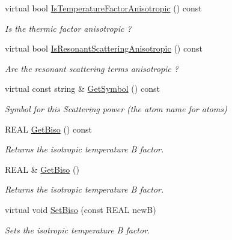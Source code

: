 \begin{DoxyCompactItemize}
virtual bool \mbox{\hyperlink{class_obj_cryst_1_1_scattering_power_aee21e7bd77b1098948b7612ada357317}{Is\+Temperature\+Factor\+Anisotropic}} () const
\begin{DoxyCompactList}\small\item\em Is the thermic factor anisotropic ? \end{DoxyCompactList}\item 
\mbox{\label{class_obj_cryst_1_1_scattering_power_ac4ed188348198aadc70f3c9b5faba4e6}} 
virtual bool \mbox{\hyperlink{class_obj_cryst_1_1_scattering_power_ac4ed188348198aadc70f3c9b5faba4e6}{Is\+Resonant\+Scattering\+Anisotropic}} () const
\begin{DoxyCompactList}\small\item\em Are the resonant scattering terms anisotropic ? \end{DoxyCompactList}\item 
virtual const string \& \mbox{\hyperlink{class_obj_cryst_1_1_scattering_power_afc2a98469a75c58259d4f81cd30510b9}{Get\+Symbol}} () const
\begin{DoxyCompactList}\small\item\em Symbol for this Scattering power (the atom name for atoms) \end{DoxyCompactList}\item 
R\+E\+AL \mbox{\hyperlink{class_obj_cryst_1_1_scattering_power_a410cbc9c760375aff093a901fd8ad0dd}{Get\+Biso}} () const
\begin{DoxyCompactList}\small\item\em Returns the isotropic temperature B factor. \end{DoxyCompactList}\item 
R\+E\+AL \& \mbox{\hyperlink{class_obj_cryst_1_1_scattering_power_a5f76422be4dc1879b9c7a64f9b2127d5}{Get\+Biso}} ()
\begin{DoxyCompactList}\small\item\em Returns the isotropic temperature B factor. \end{DoxyCompactList}\item 
virtual void \mbox{\hyperlink{class_obj_cryst_1_1_scattering_power_a497e942601480325ef6f8f345f0e1517}{Set\+Biso}} (const R\+E\+AL newB)
\begin{DoxyCompactList}\small\item\em Sets the isotropic temperature B factor. \end{DoxyCompactList}\item 

\end{DoxyCompactItemize}
